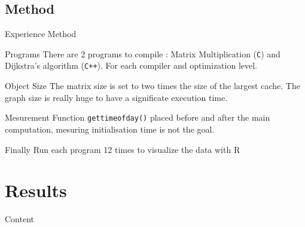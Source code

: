 \documentclass{beamer}
\newcommand{\clgg}{\texttt{C}}
\newcommand{\cpp}{\texttt{C++}}
\begin{document}
    \subsection{Method}
    
    \begin{frame}{Experience Method}
        \begin{block}{Programs}
            There are 2 programs to compile : Matrix Multiplication (\clgg) and Dijkstra's algorithm (\cpp). For each compiler and optimization level.
        \end{block}
        \begin{block}{Object Size}
            The matrix size is set to two times the size of the largest cache. \newline
            The graph size is really huge to have a significate execution time.
        \end{block}
        \begin{block}{Mesurement}
            Function \texttt{gettimeofday()} placed before and after the main computation, mesuring initialisation time is not the goal.
        \end{block}
        \begin{block}{Finally}
            Run each program 12 times to visualize the data with R
        \end{block}
            
    \end{frame}
    
    \section{Results}
    \begin{frame}[noframenumbering]{Content}
        \tableofcontents[currentsection]
    \end{frame}
    
\end{document}
